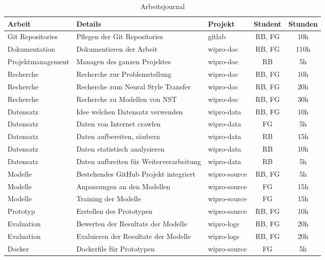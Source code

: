 \begin{table}[ht]
    \centering
    \begin{adjustbox}{angle=90}
        \begin{tabular}{|l|l|l|c|c|}
        \hline
        \textbf{Arbeit} & \textbf{Details} & \textbf{Projekt} & \textbf{Student} & \textbf{Stunden} \\
        \hline
        Git Repositories & Pflegen der Git Repositories & gitlab & RB, FG & 10h \\
        \hline
        Dokumentation & Dokumentieren der Arbeit & wipro-doc & RB, FG & 110h \\
        \hline
        Projektmanagement & Managen des ganzen Projektes & wipro-doc & RB & 5h \\
        \hline
        Recherche & Recherche zur Problemstellung & wipro-doc & RB, FG & 10h \\
        \hline
        Recherche & Recherche zum Neural Style Transfer & wipro-doc & RB, FG & 20h \\
        \hline
        Recherche & Recherche zu Modellen von \gls{NST} & wipro-doc & RB, FG & 30h \\
        \hline
        Datensatz & Idee welchen Datensatz verwenden & wipro-data & RB, FG & 10h \\
        \hline
        Datensatz & Daten von Internet crawlen & wipro-data & FG & 5h \\
        \hline
        Datensatz & Daten aufbereiten, säubern & wipro-data & RB & 15h \\
        \hline
        Datensatz & Daten statistisch analysieren & wipro-data & RB & 10h \\
        \hline
        Datensatz & Daten aufbreiten für Weiterverarbeitung & wipro-data & RB & 5h \\
        \hline
        Modelle & Bestehendes GitHub Projekt integriert & wipro-source & RB, FG & 5h \\
        \hline
        Modelle & Anpassungen an den Modellen & wipro-source & FG & 15h \\
        \hline
        Modelle & Training der Modelle & wipro-source & FG & 15h \\
        \hline
        Prototyp & Erstellen des Prototypen & wipro-source & RB, FG & 10h \\
        \hline
        Evaluation & Bewerten der Resultate der Modelle & wipro-logs & RB, FG & 20h \\
        \hline
        Evaluation & Evaluieren der Resultate der Modelle & wipro-logs & RB, FG & 20h \\
        \hline
        Docker & Dockerfile für Prototypen & wipro-source & FG & 5h \\
        \hline
        \end{tabular}
    \end{adjustbox}
	\caption{Arbeitsjournal}
	\label{tab:arbeitsjournal}
\end{table}

